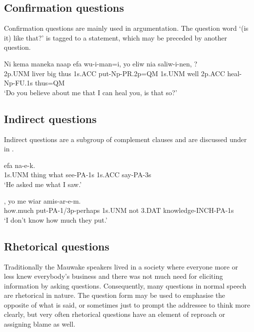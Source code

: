 \subsection{Confirmation questions}
{}
Confirmation questions are mainly used in argumentation. The question word   `(is it) like that?' is tagged to a statement, which may be preceded by another question. 

\ea%
\label{ex:x1188}
\gll Ni  kema  maneka  naap  efa  wu-i-man=i, yo  eliw  nia  saliw-i-nen,  ? \\
2p.UNM  liver  big  thus  1s.ACC  put-Np-PR.2p=QM  1s.UNM  well  2p.ACC  heal-Np-FU.1s  thus=QM    \\
\glt `Do you believe about me that I can heal you, is that so?'
\z









\subsection{Indirect questions}
{}
Indirect questions are a subgroup of complement clauses and are discussed under  in  .

\ea%
\label{ex:x1203}
  efa  na-e-k. \\
1s.UNM  thing  what  see-PA-1s  1s.ACC  say-PA-3s      \\
\glt `He asked me what I saw.'
\z





\ea%
\label{ex:x1204}
,  yo  me  wiar amis-ar-e-m. \\
how.much  put-PA-1/3p-perhaps  1s.UNM  not  3.DAT knowledge-INCH-PA-1s     \\
\glt `I don't know how much they put.'
\z




\subsection{Rhetorical questions}
{}
Traditionally the Mauwake speakers lived in a society where everyone more or less knew everybody's business and there was not much need for eliciting information by asking questions. Consequently, many questions in normal speech are rhetorical in nature. The question form may be used to emphasise the opposite of what is said, or sometimes just to prompt the addressee to think more clearly, but very often rhetorical questions have an element of reproach or assigning blame as well.

